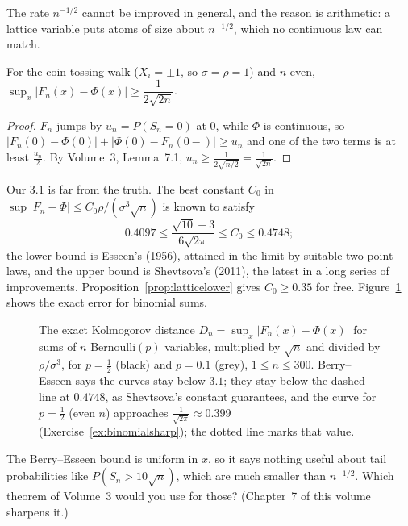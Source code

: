 The rate $n^{-1/2}$ cannot be improved in general, and the reason is arithmetic: a lattice variable puts atoms of size about $n^{-1/2}$, which no
continuous law can match.

\begin{proposition}\label{prop:latticelower}
For the coin-tossing walk ($X_i=\pm1$, so $\sigma=\rho=1$) and $n$ even, $\sup_x|F_n(x)-\Phi(x)|\ge\dfrac1{2\sqrt{2n}}$.
\end{proposition}
\begin{proof}
$F_n$ jumps by $u_n=P(S_n=0)$ at $0$, while $\Phi$ is continuous, so $|F_n(0)-\Phi(0)|+|\Phi(0)-F_n(0-)|\ge u_n$ and one of the two terms is at least
$\frac{u_n}2$. By Volume~3, Lemma~7.1, $u_n\ge\frac1{2\sqrt{n/2}}=\frac1{\sqrt{2n}}$.
\end{proof}

\begin{remark}
Our $3.1$ is far from the truth. The best constant $C_0$ in $\sup|F_n-\Phi|\le C_0\rho/(\sigma^3\sqrt n)$ is known to satisfy
\[
0.4097\le\frac{\sqrt{10}+3}{6\sqrt{2\pi}}\le C_0\le0.4748;
\]
the lower bound is Esseen's (1956), attained in the limit by suitable two-point laws, and the upper bound is Shevtsova's (2011), the latest in a long series of
improvements. Proposition~\ref{prop:latticelower} gives $C_0\ge0.35$ for free. Figure~\ref{fig:berryesseen} shows the exact error for binomial sums.
\end{remark}

\begin{figure}[ht]
\centering{}
\caption{The exact Kolmogorov distance $D_n=\sup_x|F_n(x)-\Phi(x)|$ for sums of $n$ Bernoulli$(p)$ variables, multiplied by $\sqrt n$ and divided by
$\rho/\sigma^3$, for $p=\frac12$ (black) and $p=0.1$ (grey), $1\le n\le300$. Berry--Esseen says the curves stay below $3.1$; they stay below the
dashed line at $0.4748$, as Shevtsova's constant guarantees, and the curve for $p=\frac12$ (even $n$) approaches $\frac1{\sqrt{2\pi}}\approx0.399$ (Exercise~\ref{ex:binomialsharp}); the dotted line marks that value.}
\label{fig:berryesseen}
\end{figure}

\begin{think}
The Berry--Esseen bound is uniform in $x$, so it says nothing useful about tail probabilities like $P(S_n>10\sqrt n)$, which are much smaller than $n^{-1/2}$.
Which theorem of Volume~3 would you use for those? (Chapter~7 of this volume sharpens it.)
\end{think}

